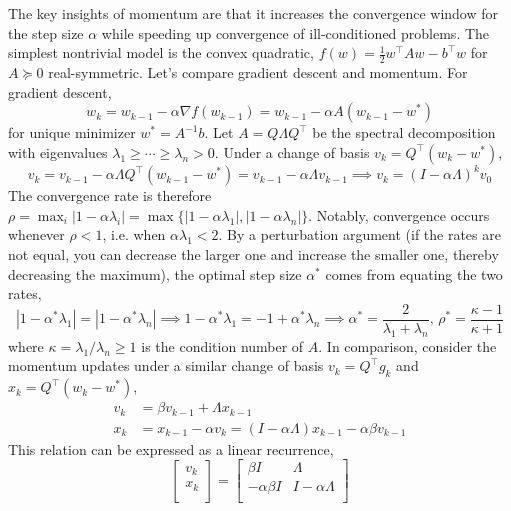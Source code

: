 \documentclass[11pt, letterpaper]{article}
\begin{document}
\begin{remark}
    The key insights of momentum are that it increases the convergence window for the step size \(\alpha\) while speeding up convergence of ill-conditioned problems. The simplest nontrivial model is the convex quadratic, \(f(w) = \frac{1}{2}w^\top Aw - b^\top w\) for \(A \succeq 0\) real-symmetric. Let's compare gradient descent and momentum. For gradient descent, 
    \[
        w_k = w_{k-1} - \alpha \nabla f(w_{k-1}) = w_{k-1} - \alpha A (w_{k-1} - w^*)
    \]
    for unique minimizer \(w^* = A^{-1}b\). Let \(A = Q\Lambda Q^\top\) be the spectral decomposition with eigenvalues \(\lambda_1 \geq \cdots \geq \lambda_n > 0\). Under a change of basis \(v_k = Q^\top (w_k - w^*)\), 
    \[
        v_k = v_{k-1} - \alpha \Lambda Q^\top (w_{k-1} - w^*) = v_{k-1} - \alpha \Lambda v_{k-1}
        \implies 
        v_k = (I - \alpha \Lambda)^k v_0
    \]
    The convergence rate is therefore \(\rho = \max_i |1 - \alpha \lambda_i| = \max\{|1 - \alpha \lambda_1|, |1 - \alpha \lambda_n|\}\). Notably, convergence occurs whenever \(\rho < 1\), i.e. when \(\alpha \lambda_1 < 2\). By a perturbation argument (if the rates are not equal, you can decrease the larger one and increase the smaller one, thereby decreasing the maximum), the optimal step size \(\alpha^*\) comes from equating the two rates, 
    \[
        |1 - \alpha^* \lambda_1| = |1 - \alpha^* \lambda_n|
        \implies 1 - \alpha^* \lambda_1 = -1 + \alpha^* \lambda_n 
        \implies \alpha^* = \frac{2}{\lambda_1 + \lambda_n},\, \rho^* = \frac{\kappa-1}{\kappa+1}
    \]
    where \(\kappa = \lambda_1 / \lambda_n \geq 1\) is the condition number of \(A\). In comparison, consider the momentum updates under a similar change of basis \(v_k = Q^\top g_k\) and \(x_k = Q^\top (w_k - w^*)\), 
    \begin{align*}
        v_k &= \beta v_{k-1} + \Lambda x_{k-1} \\
        x_k &= x_{k-1} - \alpha v_k = (I - \alpha \Lambda) x_{k-1} - \alpha \beta v_{k-1}
    \end{align*}
    This relation can be expressed as a linear recurrence, 
    \[
        \begin{bmatrix} 
            v_k \\ 
            x_k \\ 
        \end{bmatrix}
        = 
        \begin{bmatrix} 
            \beta I & \Lambda \\ 
            -\alpha\beta I & I - \alpha \Lambda \\ 

\end{bmatrix}\]
\end{remark}
\end{document}

